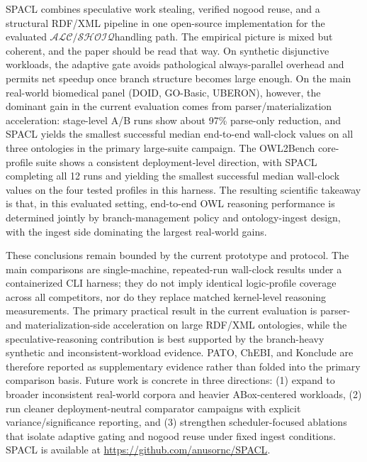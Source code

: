 \documentclass[preprint,12pt,times]{elsarticle}
\newcommand{\dlfrag}{\ensuremath{\mathcal{ALC/SHOIQ}}}
\begin{document}
SPACL combines speculative work stealing, verified nogood reuse, and a structural RDF/XML pipeline in one open-source implementation for the evaluated \dlfrag handling path. The empirical picture is mixed but coherent, and the paper should be read that way. On synthetic disjunctive workloads, the adaptive gate avoids pathological always-parallel overhead and permits net speedup once branch structure becomes large enough. On the main real-world biomedical panel (DOID, GO-Basic, UBERON), however, the dominant gain in the current evaluation comes from parser/materialization acceleration: stage-level A/B runs show about 97\% parse-only reduction, and SPACL yields the smallest successful median end-to-end wall-clock values on all three ontologies in the primary large-suite campaign. The OWL2Bench core-profile suite shows a consistent deployment-level direction, with SPACL completing all 12 runs and yielding the smallest successful median wall-clock values on the four tested profiles in this harness. The resulting scientific takeaway is that, in this evaluated setting, end-to-end OWL reasoning performance is determined jointly by branch-management policy and ontology-ingest design, with the ingest side dominating the largest real-world gains.

These conclusions remain bounded by the current prototype and protocol. The main comparisons are single-machine, repeated-run wall-clock results under a containerized CLI harness; they do not imply identical logic-profile coverage across all competitors, nor do they replace matched kernel-level reasoning measurements. The primary practical result in the current evaluation is parser- and materialization-side acceleration on large RDF/XML ontologies, while the speculative-reasoning contribution is best supported by the branch-heavy synthetic and inconsistent-workload evidence. PATO, ChEBI, and Konclude are therefore reported as supplementary evidence rather than folded into the primary comparison basis. Future work is concrete in three directions: (1) expand to broader inconsistent real-world corpora and heavier ABox-centered workloads, (2) run cleaner deployment-neutral comparator campaigns with explicit variance/significance reporting, and (3) strengthen scheduler-focused ablations that isolate adaptive gating and nogood reuse under fixed ingest conditions. SPACL is available at \url{https://github.com/anusornc/SPACL}.
\end{document}
